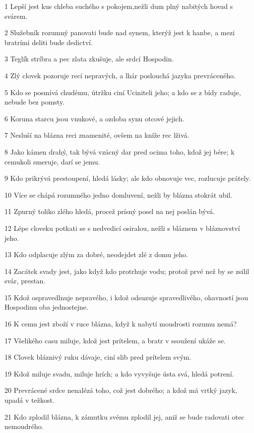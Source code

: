 \par 1 Lepší jest kus chleba suchého s pokojem,nežli dum plný nabitých hovad s svárem.
\par 2 Služebník rozumný panovati bude nad synem, kterýž jest k hanbe, a mezi bratrími deliti bude dedictví.
\par 3 Teglík stríbra a pec zlata zkušuje, ale srdcí Hospodin.
\par 4 Zlý clovek pozoruje recí nepravých, a lhár poslouchá jazyka prevráceného.
\par 5 Kdo se posmívá chudému, útržku ciní Uciniteli jeho; a kdo se z bídy raduje, nebude bez pomsty.
\par 6 Koruna starcu jsou vnukové, a ozdoba synu otcové jejich.
\par 7 Nesluší na blázna reci znamenité, ovšem na kníže rec lživá.
\par 8 Jako kámen drahý, tak bývá vzácný dar pred ocima toho, kdož jej bére; k cemukoli smeruje, darí se jemu.
\par 9 Kdo prikrývá prestoupení, hledá lásky; ale kdo obnovuje vec, rozlucuje prátely.
\par 10 Více se chápá rozumného jedno domluvení, nežli by blázna stokrát ubil.
\par 11 Zpurný toliko zlého hledá, procež prísný posel na nej poslán bývá.
\par 12 Lépe cloveku potkati se s nedvedicí osiralou, nežli s bláznem v bláznovství jeho.
\par 13 Kdo odplacuje zlým za dobré, neodejdet zlé z domu jeho.
\par 14 Zacátek svady jest, jako když kdo protrhuje vodu; protož prvé než by se zsilil svár, prestan.
\par 15 Kdož ospravedlnuje nepravého, i kdož odsuzuje spravedlivého, ohavností jsou Hospodinu oba jednostejne.
\par 16 K cemu jest zboží v ruce blázna, když k nabytí moudrosti rozumu nemá?
\par 17 Všelikého casu miluje, kdož jest prítelem, a bratr v ssoužení ukáže se.
\par 18 Clovek bláznivý ruku dávaje, ciní slib pred prítelem svým.
\par 19 Kdož miluje svadu, miluje hrích; a kdo vyvyšuje ústa svá, hledá potrení.
\par 20 Prevrácené srdce nenalézá toho, což jest dobrého; a kdož má vrtký jazyk, upadá v težkost.
\par 21 Kdo zplodil blázna, k zámutku svému zplodil jej, aniž se bude radovati otec nemoudrého.
